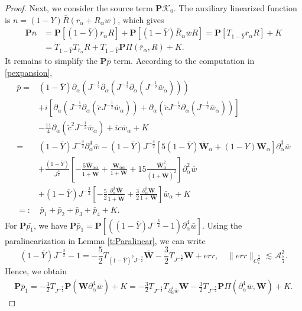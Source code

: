 \documentclass[10pt]{amsart}
\theoremstyle{remark}
\theoremstyle{definition}
\numberwithin{equation}{section}
\newcommand{\p}{\partial}
\newcommand{\al}{\alpha}
\newcommand{\f}{\frac}
\newcommand{\bw}{\mathbf{W}}
\newcommand{\nP}{{\mathbf P}}
\begin{document}
\begin{proof}
Next, we consider the source term  $\nP \mathcal{K}_0$.
The auxiliary linearized function is $n = (1-Y)\bar{R}(r_\alpha + R_\alpha w)$, which gives
\begin{align*}
    \nP \bar{n} &= \nP[(1-\bar{Y})\bar{r}_\alpha R] + \nP[(1-\bar{Y})\bar{R}_\alpha \bar{w}R] = \nP[T_{1-\bar{Y}}\bar{r}_\alpha R] + K \\
    &=  T_{1-\bar{Y}}T_{\bar{r}_\alpha} R + T_{1-\bar{Y}}\nP\Pi(\bar{r}_\alpha, R) + K.
\end{align*}
It remains  to simplify the $\nP \bar{p}$ term. 
According to the computation in \eqref{pexpansion},
\begin{align*}
\bar{p}=&(1-\bar{Y})\p_{\al}(J^{-\f12}\p_{\al}(J^{-\f12}\p_{\al}(J^{-\f12}\bar{w}_{\al})))\\
&+i\left[\p_{\al}\left(J^{-\f12}\p_{\al}\left(\tilde{c}J^{-\f12}\bar{w}_{\al}\right)\right)
+\p_{\al}\left(\tilde{c}J^{-\f12}\p_{\al}\left(J^{-\f12}\bar{w}_{\al}\right)\right)\right]\\
&-\f{11}4\p_{\al}\left(\tilde{c}^2J^{-\f12}\bar{w}_{\al}\right)
+ic\bar{w}_{\al} + K\\
=&(1-\bar{Y})J^{-\f32}\p_{\al}^4\bar{w}
-(1-\bar{Y})J^{-\f32}\left[5(1-\bar{Y})\bar{\mathbf{W}}_{\al}+(1-Y)\mathbf{W}_{\al}\right]\p_{\al}^3\bar{w}\\
&+\f{(1-\bar{Y})}{J^{\f32}}\left[-\f{5\bar{\mathbf{W}}_{\al\al}}{1+\bar{\mathbf{W}}}+\f{\mathbf{W}_{\al\al}}{1+\mathbf{W}}+15\f{\bar{\mathbf{W}}^2_{\al}}{(1+\bar{\mathbf{W}})^2}\right]\p_{\al}^2\bar{w}\\
&+(1-\bar{Y})J^{-\f32}\left[-\f52\f{\p^3_{\al}\bar{\mathbf{W}}}{1+\bar{\mathbf{W}}}+\f32\f{\p^3_{\al}\mathbf{W}}{1+\mathbf{W}}\right]\bar{w}_{\al}+K\\
=:&\,\bar{p}_1+\bar{p}_2+\bar{p}_3+\bar{p}_4+K.
\end{align*}
For $\nP\bar{p_1}$, we have $\nP\bar{p}_1= \nP[((1-\bar{Y})J^{-\f32}-1)\p_{\al}^4\bar{w}].$
Using the paralinearization in Lemma \ref{t:Paralinear}, we can write
\begin{equation*}
 (1-\bar{Y})J^{-\f32}-1 = -\f52T_{(1-\bar{Y})^2J^{-\f32}} \bar{\bw} -\f32 T_{J^{-\f52}}\bw + err, \quad \|err\|_{C_*^\f72}  \lesssim \mathcal{A}^2_{\f74}.
\end{equation*}
Hence, we obtain
\begin{align*}
\nP\bar{p}_1=-\f32 T_{J^{-\f52}} \nP(\bw \p^4_{\al}\bar{w})+K = -\f32 T_{J^{-\f52}} T_{\p^4_{\al}\bar{w}}\bw -\f32 T_{J^{-\f52}} \nP \Pi(\p^4_{\al}\bar{w},\bw) +K .
\end{align*}

\end{proof}
\end{document}
